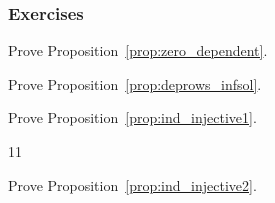 \subsubsection{Exercises}
\begin{exercise}
Prove Proposition~\ref{prop:zero_dependent}.
\end{exercise}

\begin{exercise}
Prove Proposition~\ref{prop:deprows_infsol}.
\end{exercise}

\begin{exercise}
Prove Proposition~\ref{prop:ind_injective1}.
\end{exercise}11

\begin{exercise}
Prove Proposition~\ref{prop:ind_injective2}.
\end{exercise}

